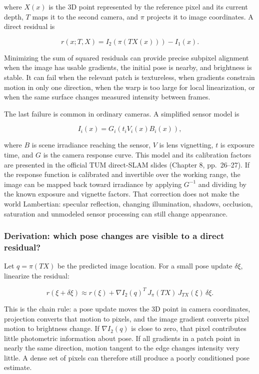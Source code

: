 where \(X(x)\) is the 3D point represented by the reference pixel and its current depth, \(T\) maps it to the second camera, and \(\pi\) projects it to image coordinates. A direct residual is

\[
r(x;T,X)=I_2\!\left(\pi(TX(x))\right)-I_1(x).
\]

Minimizing the sum of squared residuals can provide precise subpixel alignment when the image has usable gradients, the initial pose is nearby, and brightness is stable. It can fail when the relevant patch is textureless, when gradients constrain motion in only one direction, when the warp is too large for local linearization, or when the same surface changes measured intensity between frames.

The last failure is common in ordinary cameras. A simplified sensor model is

\[
I_i(x)=G_i\!\left(t_i V_i(x) B_i(x)\right),
\]

where \(B\) is scene irradiance reaching the sensor, \(V\) is lens vignetting, \(t\) is exposure time, and \(G\) is the camera response curve. This model and its calibration factors are presented in the official TUM direct-SLAM slides (Chapter 8, pp.~26--27). If the response function is calibrated and invertible over the working range, the image can be mapped back toward irradiance by applying \(G^{-1}\) and dividing by the known exposure and vignette factors. That correction does not make the world Lambertian: specular reflection, changing illumination, shadows, occlusion, saturation and unmodeled sensor processing can still change appearance.

\subsubsection{Derivation: which pose changes are visible to a direct residual?}\label{02-foundations-ii-ch036-derivation-which-pose-changes-are-visible-to-a-direct-residual}

\hypertarget{02-foundations-ii-ch036-derivation-which-pose-changes-are-visible-to-a-direct-residual}{}

Let \(q=\pi(TX)\) be the predicted image location. For a small pose update \(\delta\xi\), linearize the residual:

\[
r(\xi+\delta\xi) \approx r(\xi)+\nabla I_2(q)^T\,J_\pi(TX)\,J_{TX}(\xi)\,\delta\xi.
\]

This is the chain rule: a pose update moves the 3D point in camera coordinates, projection converts that motion to pixels, and the image gradient converts pixel motion to brightness change. If \(\nabla I_2(q)\) is close to zero, that pixel contributes little photometric information about pose. If all gradients in a patch point in nearly the same direction, motion tangent to the edge changes intensity very little. A dense set of pixels can therefore still produce a poorly conditioned pose estimate.

